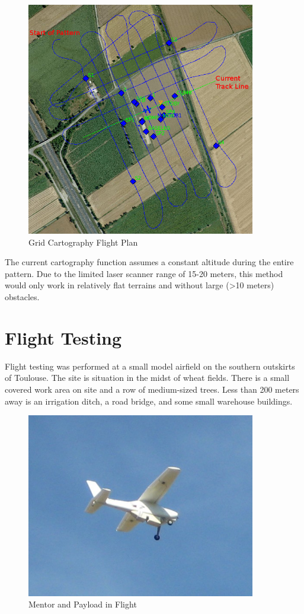 \documentclass[a4paper,11pt]{report}
\begin{document}
\begin{figure}[ht]
 \centering
 \includegraphics[width=10cm]{pprz_cartography.png}
 \caption{Grid Cartography Flight Plan}
 \label{fig:gridcarto}
\end{figure}

The current cartography function assumes a constant altitude during the entire pattern. Due to the limited laser scanner range of 15-20 meters, this method would only work in relatively flat terrains and without large (>10 meters) obstacles.

\chapter{Flight Testing}
\label{flight_tests}

Flight testing was performed at a small model airfield on the southern outskirts of Toulouse. The site is situation in the midst of wheat fields. There is a small covered work area on site and a row of medium-sized trees. Less than 200 meters away is an irrigation ditch, a road bridge, and some small warehouse buildings.

\begin{figure}[ht]
 \centering
 \includegraphics[width=10cm]{mentor_in_flight.JPG}
 \caption{Mentor and Payload in Flight}
 \label{fig:mentor_flying}
\end{figure}
\end{document}

